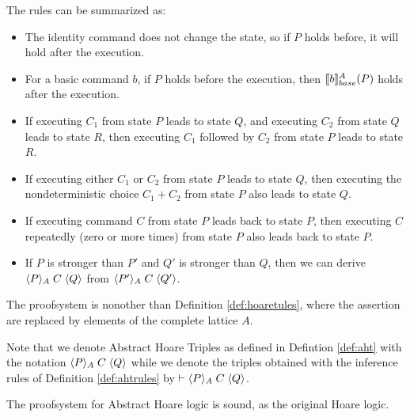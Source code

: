 \documentclass[
  10pt,       %
  twoside,    %
  a4paper,    %
  english,    %
  tikz,       %
  openright,  %
]{book}
\begin{document}
The rules can be summarized as:
\begin{itemize}
  \item The identity command does not change the state, so if $P$ holds before,
    it will hold after the execution.

  \item For a basic command $b$, if $P$ holds before the execution, then 
    $\llbracket b \rrbracket_{base}^A(P)$ holds after the execution.

  \item If executing $C_1$ from state $P$ leads to state $Q$, and executing
    $C_2$ from state $Q$ leads to state $R$, then executing $C_1$ followed by
    $C_2$ from state $P$ leads to state $R$.

  \item If executing either $C_1$ or $C_2$ from state $P$ leads to state $Q$,
    then executing the nondeterministic choice $C_1 + C_2$ from state $P$ also
    leads to state $Q$.

  \item If executing command $C$ from state $P$ leads back to state $P$, then
    executing $C$ repeatedly (zero or more times) from state $P$ also leads
    back to state $P$.

  \item If $P$ is stronger than $P'$ and $Q'$ is stronger than $Q$, then we can
    derive $\langle P \rangle_{A} \; C \; \langle Q \rangle$ from $\langle P' \rangle_{A} \; C \; \langle Q' \rangle$.
\end{itemize}

The proofsystem is nonother than Definition \ref{def:hoaretules},
where the assertion are replaced by elements of the complete lattice $A$.

Note that we denote Abstract Hoare Triples as defined in Defintion \ref{def:aht}
with the notation $\langle P \rangle_{A} \; C \; \langle Q \rangle$ while we denote the triples obtained
with the inference rules of Definition \ref{def:ahtrules} by $\vdash 
\langle P \rangle_{A} \; C \; \langle Q \rangle$.

The proofsystem for Abstract Hoare logic is sound, as the original Hoare logic.
\end{document}

